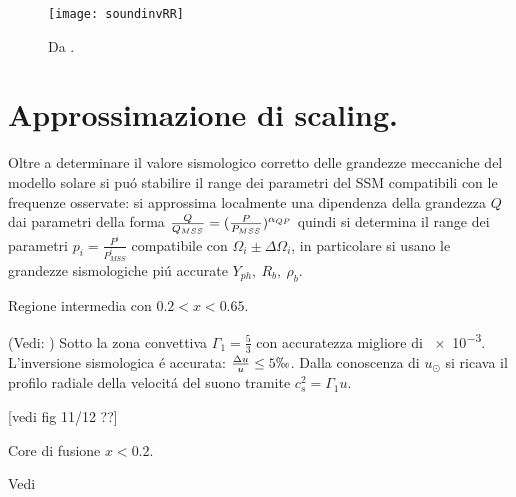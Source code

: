 \documentclass[../main.tex]{subfiles}
\begin{document}
\begin{figure}[!h]
\centering
\texttt{[image: soundinvRR]}
\caption{Da \cite{boothroyd2003our}.}
\end{figure}

\section{Approssimazione di scaling.}

Oltre a determinare il valore sismologico corretto delle grandezze meccaniche del modello solare si pu\'o stabilire il range dei parametri del SSM compatibili con le frequenze osservate: si approssima localmente una dipendenza della grandezza $Q$ dai parametri della forma $\frac{Q}{Q_{MSS}}=(\frac{P}{P_{MSS}})^{\alpha_{QP}}$ quindi si determina il range dei parametri $p_i=\frac{P^i}{P_{MSS}^i}$ compatibile con $\Omega_i\pm\Delta\Omega_i$, in particolare si usano le grandezze sismologiche pi\'u accurate $Y_{ph},\ R_b,\ \rho_b$.

{Regione intermedia con $0.2<x<0.65$.}

(Vedi: \cite{bah04accurately})
Sotto la zona convettiva $\Gamma_1=\frac{5}{3}$ con accuratezza migliore di \num{e-3}. L'inversione sismologica \'e accurata: $\frac{\Delta u}{u}\leq5 \permil$. Dalla conoscenza di $u_{\odot}$ si ricava il profilo radiale della velocit\'a del suono tramite $c_s^2=\Gamma_1 u$.

[vedi fig 11/12 \cite{ell95opacity} ??]


{Core di fusione $x<0.2$.}

Vedi \cite{ell98relativistic}

\end{document}
